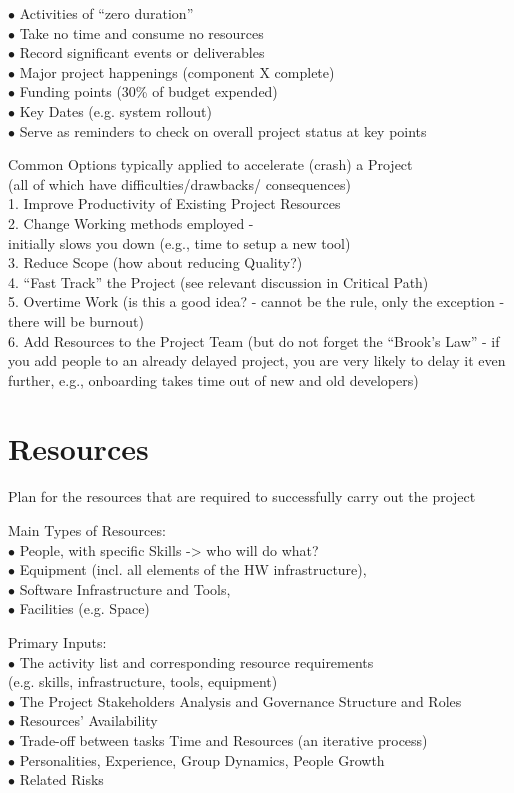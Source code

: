\documentclass[]{project_plan}
\newcommand{\bulletPoint}{\hspace{-3.1pt}$\bullet$ \hspace{5pt}}
\begin{document}
\bulletPoint Activities of “zero duration”\\
\bulletPoint Take no time and consume no resources\\
\bulletPoint Record significant events or deliverables\\
\bulletPoint Major project happenings (component X complete)\\
\bulletPoint Funding points (30\% of budget expended)\\
\bulletPoint Key Dates (e.g. system rollout)\\
\bulletPoint Serve as reminders to check on overall project status at key points

Common Options typically applied to accelerate (crash) a Project\\
(all of which have difficulties/drawbacks/ consequences)\\
1. Improve Productivity of Existing Project Resources\\
2. Change Working methods employed - \\initially slows you down (e.g., time to setup a new tool)\\
3. Reduce Scope (how about reducing Quality?)\\
4. “Fast Track” the Project (see relevant discussion in Critical Path)\\
5. Overtime Work (is this a good idea? - cannot be the rule, only the exception - there will be burnout)\\
6. Add Resources to the Project Team (but do not forget the “Brook’s Law” - if you add people to an already delayed project, you are very likely to delay it even further, e.g., onboarding takes time out of new and old developers)

\section{Resources}

Plan for the resources that are required to successfully carry out the project

Main Types of Resources:\\
\bulletPoint People, with specific Skills -> who will do what?\\
\bulletPoint Equipment (incl. all elements of the HW infrastructure),\\
\bulletPoint Software Infrastructure and Tools,\\
\bulletPoint Facilities (e.g. Space)

Primary Inputs:\\
\bulletPoint The activity list and corresponding resource requirements\\(e.g. skills, infrastructure, tools, equipment)\\
\bulletPoint The Project Stakeholders Analysis and Governance Structure and Roles\\
\bulletPoint Resources’ Availability\\
\bulletPoint Trade-off between tasks Time and Resources (an iterative process)\\
\bulletPoint Personalities, Experience, Group Dynamics, People Growth\\
\bulletPoint Related Risks
\end{document}
